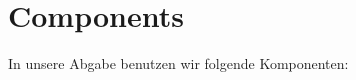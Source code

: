 

\newcommand{\dozent}{Prof. Dr. Matthias Wählisch, Marcin Nawrocki, M.Sc.}
\newcommand{\tutor}{-}
\newcommand{\tutoriumNo}{01\\Materialien: Latex, Python}
\newcommand{\ubungNo}{1}
\newcommand{\veranstaltung}{Telematics Project overview}
\newcommand{\semester}{WS21/22}
\newcommand{\studenten}{David Ly \& Jonny Lam \& Thore Brehmer}




\section{Components}
In unsere Abgabe benutzen wir folgende Komponenten:
